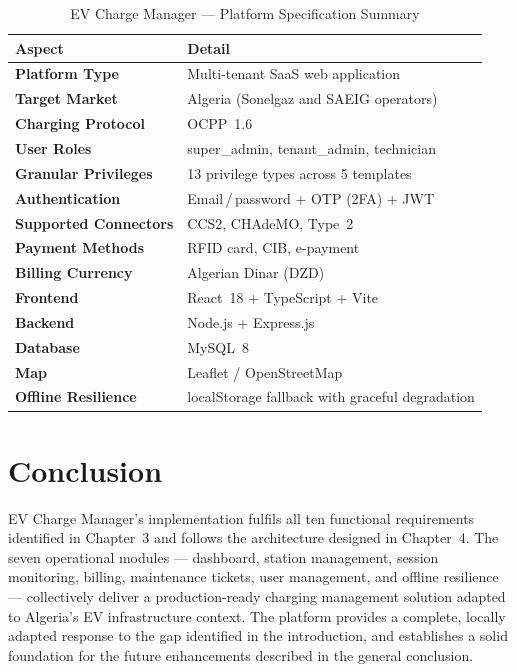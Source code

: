 \documentclass[12pt,a4paper]{report}
\begin{document}
\begin{table}[h!]
  \centering
  \caption{EV Charge Manager --- Platform Specification Summary}
  \label{tab:platform-summary}
  \renewcommand{\arraystretch}{1.3}
  \begin{tabular}{>{\bfseries}p{4.5cm} p{9cm}}
    \toprule
    Aspect                & Detail \\
    \midrule
    Platform Type         & Multi-tenant SaaS web application \\
    Target Market         & Algeria (Sonelgaz and SAEIG operators) \\
    Charging Protocol     & OCPP~1.6~\autocite{ocpp16_ed2} \\
    User Roles            & super\_admin, tenant\_admin, technician \\
    Granular Privileges   & 13 privilege types across 5 templates \\
    Authentication        & Email\,/\,password + OTP (2FA) + JWT~\autocite{rfc7519} \\
    Supported Connectors  & CCS2, CHAdeMO, Type~2 \\
    Payment Methods       & RFID card, CIB, e-payment \\
    Billing Currency      & Algerian Dinar (DZD) \\
    Frontend              & React~18 + TypeScript + Vite~\autocite{react_docs, vite_docs} \\
    Backend               & Node.js + Express.js~\autocite{nodejs_express} \\
    Database              & MySQL~8~\autocite{mysql_docs} \\
    Map                   & Leaflet / OpenStreetMap \\
    Offline Resilience    & localStorage fallback with graceful degradation \\
    \bottomrule
  \end{tabular}
\end{table}

\section{Conclusion}

EV Charge Manager's implementation fulfils all ten functional requirements identified in
Chapter~3 and follows the architecture designed in Chapter~4. The seven operational
modules --- dashboard, station management, session monitoring, billing, maintenance tickets,
user management, and offline resilience --- collectively deliver a production-ready charging
management solution adapted to Algeria's EV infrastructure context. The platform provides a
complete, locally adapted response to the gap identified in the introduction, and establishes
a solid foundation for the future enhancements described in the general conclusion.
\end{document}
